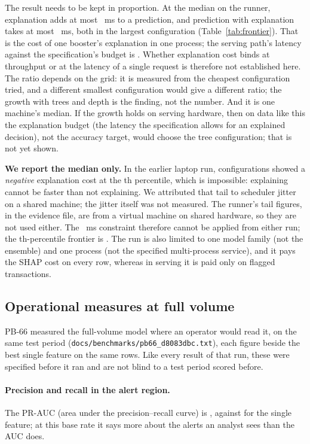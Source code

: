 The result needs to be kept in proportion. At the median on the runner, explanation adds at most
\nFrCostE{}~ms to a prediction, and prediction with explanation takes at most \nFrShapE{}~ms, both
in the largest configuration (Table~\ref{tab:frontier}). That is the cost of one booster's
explanation in one process; the serving path's latency against the specification's budget is
. Whether explanation cost binds at throughput or at the latency of a single
request is therefore not established here. The ratio depends on the grid: it is measured from the cheapest configuration tried, and a different smallest configuration
would give a different ratio; the growth with trees and depth is the finding, not the number. And
it is one machine's median. If the growth holds on serving hardware, then on data like this the explanation
budget (the latency the specification allows for an explained decision), not the accuracy target, would choose the tree configuration; that is not yet shown.

\textbf{We report the median only.} In the earlier laptop run, \nFrontNegative{} configurations
showed a \emph{negative} explanation cost at the \nPctlTail{}th percentile, which is impossible:
explaining cannot be faster than not explaining. We attributed that tail to scheduler jitter on a
shared machine; the jitter itself was not measured. The runner's tail figures, in the evidence file,
are from a virtual machine on shared hardware, so they are not used either. The
\nLatencyPNineNineShap{}~ms constraint therefore cannot be applied from either run; the
\nPctlTail{}th-percentile frontier is . The run is also limited to one model family (not the ensemble) and one process (not
the specified multi-process service), and it pays the SHAP cost on every row, whereas in serving it
is paid only on flagged transactions.

\subsection{Operational measures at full volume}
\label{sec:operational}

PB-66 measured the full-volume model where an operator would read it, on the same test period
(\texttt{docs/benchmarks/pb66\_d8083dbc.txt}), each figure beside the best single feature on the
same rows. Like every result of that run, these were specified before it ran and are not blind to a
test period scored before.

\paragraph{Precision and recall in the alert region.} The PR-AUC (area under the precision--recall curve) is \nPbPRAUC{} \nPbPRAUCci{},
against \nPbPRBase{} \nPbPRBaseci{} for the single feature; at this base rate it says more about the
alerts an analyst sees than the AUC does.

